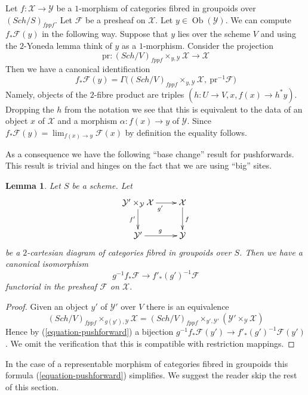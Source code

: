 \documentclass{stacks-project}
\theoremstyle{plain}
\newtheorem{lemma}[subsection]{Lemma}
\theoremstyle{definition}
\theoremstyle{remark}
\numberwithin{equation}{subsection}
\def\lim{\mathop{\mathrm{lim}}\nolimits}
\def\Sch{\mathit{Sch}}
\def\Ob{\mathop{\mathrm{Ob}}\nolimits}
\begin{document}
\noindent
Let $f : \mathcal{X} \to \mathcal{Y}$ be a $1$-morphism of categories
fibred in groupoids over $(\Sch/S)_{fppf}$. Let $\mathcal{F}$
be a presheaf on $\mathcal{X}$. Let $y \in \Ob(\mathcal{Y})$.
We can compute $f_*\mathcal{F}(y)$ in the following way. Suppose that
$y$ lies over the scheme $V$ and using the $2$-Yoneda lemma think
of $y$ as a $1$-morphism. Consider the projection
$$
\text{pr} :
(\Sch/V)_{fppf} \times_{y, \mathcal{Y}} \mathcal{X}
\longrightarrow
\mathcal{X}
$$
Then we have a canonical identification
\begin{equation}
\label{equation-pushforward}
f_*\mathcal{F}(y) = \Gamma\Big(
(\Sch/V)_{fppf} \times_{y, \mathcal{Y}} \mathcal{X},
\ \text{pr}^{-1}\mathcal{F}\Big)
\end{equation}
Namely, objects of the $2$-fibre product are triples
$(h : U \to V, x, f(x) \to h^*y)$. Dropping the $h$ from the
notation we see that this is equivalent to the data of an object
$x$ of $\mathcal{X}$ and a morphism $\alpha : f(x) \to y$ of $\mathcal{Y}$.
Since $f_*\mathcal{F}(y) = \lim_{f(x) \to y} \mathcal{F}(x)$ by definition
the equality follows.

\medskip\noindent
As a consequence we have the following ``base change'' result for
pushforwards. This result is trivial and hinges on the fact that
we are using ``big'' sites.

\begin{lemma}
\label{lemma-base-change}
Let $S$ be a scheme. Let
$$
\xymatrix{
\mathcal{Y}' \times_\mathcal{Y} \mathcal{X} \ar[r]_{g'} \ar[d]_{f'} &
\mathcal{X} \ar[d]^f \\
\mathcal{Y}' \ar[r]^g & \mathcal{Y}
}
$$
be a $2$-cartesian diagram of categories fibred in groupoids over $S$.
Then we have a canonical isomorphism
$$
g^{-1}f_*\mathcal{F} \longrightarrow f'_*(g')^{-1}\mathcal{F}
$$
functorial in the presheaf $\mathcal{F}$ on $\mathcal{X}$.
\end{lemma}

\begin{proof}
Given an object $y'$ of $\mathcal{Y}'$ over $V$
there is an equivalence
$$
(\Sch/V)_{fppf} \times_{g(y'), \mathcal{Y}} \mathcal{X}
=
(\Sch/V)_{fppf} \times_{y', \mathcal{Y}'}
(\mathcal{Y}' \times_\mathcal{Y} \mathcal{X})
$$
Hence by (\ref{equation-pushforward}) a bijection
$g^{-1}f_*\mathcal{F}(y') \to f'_*(g')^{-1}\mathcal{F}(y')$.
We omit the verification that this is compatible with restriction
mappings.
\end{proof}

\noindent
In the case of a representable morphism of categories fibred in groupoids
this formula (\ref{equation-pushforward}) simplifies. We suggest the
reader skip the rest of this section.
\end{document}
